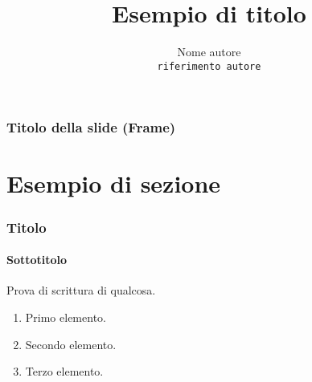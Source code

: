 \documentclass{beamer}
\title{Esempio di titolo}
\author{Nome autore \\ \texttt{riferimento autore}}
\institute{Nome istituto}
\begin{document}
	\begin{frame} 
		\maketitle 
	\end{frame}

	\begin{frame} 
		\frametitle{Titolo della slide (Frame)} 
		\tableofcontents 
	\end{frame}

	\section{Esempio di sezione} 
	\begin{frame} 
		\frametitle{Titolo} 
		\framesubtitle{Sottotitolo} 

			Prova di scrittura di qualcosa. 
	
		\begin{enumerate}
			\item Primo elemento. 
			\item Secondo elemento.
			\item Terzo elemento.
			\qedhere 
		\end{enumerate} 

\end{frame}
\end{document}
